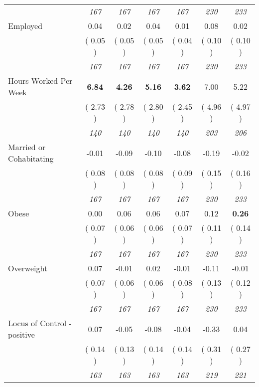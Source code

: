 \begin{tabular}{l c c c c c c}
& \textit{ 167 } & \textit{ 167 } & \textit{ 167 } & \textit{ 167 } & \textit{ 230 } & \textit{ 233 } \\
Employed &      0.04 &      0.02 &      0.04 &      0.01 &      0.08 &      0.02 \\
& (     0.05 ) & (     0.05 ) & (     0.05 ) & (     0.04 ) & (     0.10 ) & (     0.10 ) \\
& \textit{ 167 } & \textit{ 167 } & \textit{ 167 } & \textit{ 167 } & \textit{ 230 } & \textit{ 233 } \\
Hours Worked Per Week & \textbf{      6.84 } & \textbf{      4.26 } & \textbf{      5.16 } & \textbf{     3.62} &      7.00 &      5.22 \\
& (     2.73 ) & (     2.78 ) & (     2.80 ) & (     2.45 ) & (     4.96 ) & (     4.97 ) \\
& \textit{ 140 } & \textit{ 140 } & \textit{ 140 } & \textit{ 140 } & \textit{ 203 } & \textit{ 206 } \\
Married or Cohabitating &     -0.01 &     -0.09 &     -0.10 &     -0.08 &     -0.19 &     -0.02 \\
& (     0.08 ) & (     0.08 ) & (     0.08 ) & (     0.09 ) & (     0.15 ) & (     0.16 ) \\
& \textit{ 167 } & \textit{ 167 } & \textit{ 167 } & \textit{ 167 } & \textit{ 230 } & \textit{ 233 } \\
Obese &      0.00 &      0.06 &      0.06 &      0.07 &      0.12 & \textbf{      0.26 } \\
& (     0.07 ) & (     0.06 ) & (     0.06 ) & (     0.07 ) & (     0.11 ) & (     0.14 ) \\
& \textit{ 167 } & \textit{ 167 } & \textit{ 167 } & \textit{ 167 } & \textit{ 230 } & \textit{ 233 } \\
Overweight &      0.07 &     -0.01 &      0.02 &     -0.01 &     -0.11 &     -0.01 \\
& (     0.07 ) & (     0.06 ) & (     0.06 ) & (     0.08 ) & (     0.13 ) & (     0.12 ) \\
& \textit{ 167 } & \textit{ 167 } & \textit{ 167 } & \textit{ 167 } & \textit{ 230 } & \textit{ 233 } \\
Locus of Control - positive &      0.07 &     -0.05 &     -0.08 &     -0.04 &     -0.33 &      0.04 \\
& (     0.14 ) & (     0.13 ) & (     0.14 ) & (     0.14 ) & (     0.31 ) & (     0.27 ) \\
& \textit{ 163 } & \textit{ 163 } & \textit{ 163 } & \textit{ 163 } & \textit{ 219 } & \textit{ 221 } \\

\end{tabular}
